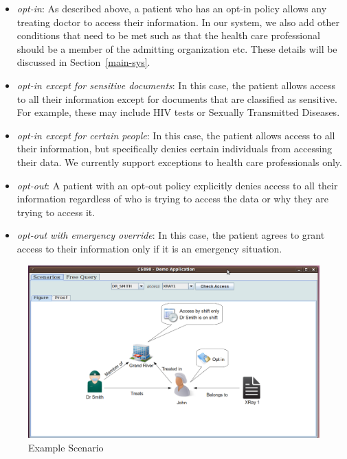 \documentclass[conference]{IEEEtran}
\begin{document}
\begin{itemize}
 \item \textit{opt-in}: As described above, a patient who has an opt-in policy allows any treating doctor to access their information. In our system, we also
add other conditions that need to be met such as that the health care professional should be a member of the admitting organization etc. These details will be
discussed in Section~\ref{main-sys}.
\item \textit{opt-in except for sensitive documents}: In this case, the patient allows access to all their information except for documents that are classified
as sensitive. For example, these may include HIV tests or Sexually Transmitted Diseases. 
\item \textit{opt-in except for certain people}: In this case, the patient allows access to all their information, but specifically denies certain individuals
from accessing their data. We currently support exceptions to health care professionals only.
\item \textit{opt-out}: A patient with an opt-out policy explicitly denies access to all their information regardless of who is trying to access the data or
why they are trying to access it.
\item \textit{opt-out with emergency override}: In this case, the patient agrees to grant access to their information only if it is an emergency situation. 
\end{itemize}

\begin{figure}[!t]
 \centering
 \includegraphics[scale=0.25,keepaspectratio=true]{./main.png}
 \caption{Example Scenario}
 \label{fig:mainscreen}
\end{figure}
\end{document}
